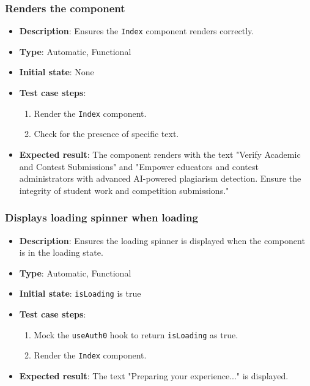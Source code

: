 \documentclass[12pt, titlepage]{article}
\begin{document}
\subsubsection{Renders the component}
\begin{itemize}
    \item \textbf{Description}: Ensures the \texttt{Index} component renders correctly.
    \item \textbf{Type}: Automatic, Functional
    \item \textbf{Initial state}: None
    \item \textbf{Test case steps}:
    \begin{enumerate}
        \item Render the \texttt{Index} component.
        \item Check for the presence of specific text.
    \end{enumerate}
    \item \textbf{Expected result}: The component renders with the text "Verify Academic and Contest Submissions" and "Empower educators and contest administrators with advanced AI-powered plagiarism detection. Ensure the integrity of student work and competition submissions."
\end{itemize}

\subsubsection{Displays loading spinner when loading}
\begin{itemize}
    \item \textbf{Description}: Ensures the loading spinner is displayed when the component is in the loading state.
    \item \textbf{Type}: Automatic, Functional
    \item \textbf{Initial state}: \texttt{isLoading} is true
    \item \textbf{Test case steps}:
    \begin{enumerate}
        \item Mock the \texttt{useAuth0} hook to return \texttt{isLoading} as true.
        \item Render the \texttt{Index} component.
    \end{enumerate}
    \item \textbf{Expected result}: The text "Preparing your experience..." is displayed.
\end{itemize}
\end{document}
